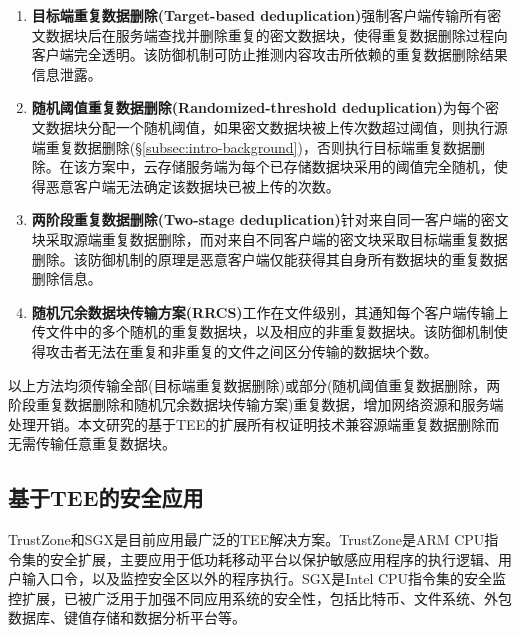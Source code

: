 \begin{enumerate}[leftmargin=0em]
  \item \textbf{目标端重复数据删除(Target-based deduplication)}强制客户端传输所有密文数据块后在服务端查找并删除重复的密文数据块，使得重复数据删除过程向客户端完全透明。该防御机制可防止推测内容攻击所依赖的重复数据删除结果信息泄露。
  \item \textbf{随机阈值重复数据删除(Randomized-threshold deduplication)}为每个密文数据块分配一个随机阈值，如果密文数据块被上传次数超过阈值，则执行源端重复数据删除(\S\ref{subsec:intro-background})，否则执行目标端重复数据删除。在该方案中，云存储服务端为每个已存储数据块采用的阈值完全随机，使得恶意客户端无法确定该数据块已被上传的次数。
  \item \textbf{两阶段重复数据删除(Two-stage deduplication)}针对来自同一客户端的密文块采取源端重复数据删除，而对来自不同客户端的密文块采取目标端重复数据删除。该防御机制的原理是恶意客户端仅能获得其自身所有数据块的重复数据删除信息。
  \item \textbf{随机冗余数据块传输方案(RRCS)}工作在文件级别，其通知每个客户端传输上传文件中的多个随机的重复数据块，以及相应的非重复数据块。该防御机制使得攻击者无法在重复和非重复的文件之间区分传输的数据块个数。
\end{enumerate}

以上方法均须传输全部(目标端重复数据删除)或部分(随机阈值重复数据删除，两阶段重复数据删除和随机冗余数据块传输方案)重复数据，增加网络资源和服务端处理开销。本文研究的基于TEE的扩展所有权证明技术兼容源端重复数据删除而无需传输任意重复数据块。

\subsection{基于TEE的安全应用}
\label{subsec:compare-tee}

TrustZone和SGX是目前应用最广泛的TEE解决方案。TrustZone是ARM CPU指令集的安全扩展，主要应用于低功耗移动平台以保护敏感应用程序的执行逻辑、用户输入口令，以及监控安全区以外的程序执行。SGX是Intel CPU指令集的安全监控扩展，已被广泛用于加强不同应用系统的安全性，包括比特币、文件系统、外包数据库、键值存储和数据分析平台等。

